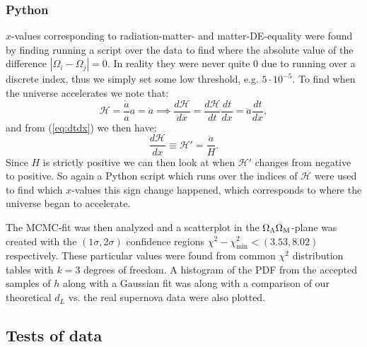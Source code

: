 \documentclass[%
reprint,
 amsmath,amssymb,
 aps,
]{revtex4-2}
\newcommand{\Hp}{\mathcal{H}}
\begin{document}
\subsubsection{Python}
$x$-values corresponding to radiation-matter- and matter-DE-equality were found by finding running a script over the data to find where the absolute value of the difference $|\Omega_i-\Omega_j|=0$. In reality they were never quite 0 due to running over a discrete index, thus we simply set some low threshold, e.g. $5\cdot10^{-5}$. To find when the universe accelerates we note that:
\[\Hp=\frac{\dot a}{a}a=\dot a\implies \frac{d\Hp}{dx}=\frac{d\Hp}{dt}\frac{dt}{dx}=\ddot{a}\frac{dt}{dx},\]
and from (\ref{eq:dtdx}) we then have:
\[\frac{d\Hp}{dx}\equiv\Hp'=\frac{\ddot a}{H}.\]
Since $H$ is strictly positive we can then look at when $\Hp'$ changes from negative to positive. So again a Python script which runs over the indices of $\Hp$ were used to find which $x$-values this sign change happened, which corresponds to where the universe began to accelerate. 

The MCMC-fit was then analyzed and a scatterplot in the $\Omega_\Lambda\Omega_\text M$-plane was created with the $(1\sigma,2\sigma)$ confidence regions $\chi^2-\chi^2_\text{min}<(3.53,8.02)$ respectively. These particular values were found from common $\chi^2$ distribution tables with $k=3$ degrees of freedom. A histogram of the PDF  from the accepted samples of $h$ along with a Gaussian fit was along with a comparison of our theoretical $d_L$ vs. the real supernova data were also plotted.

\subsection{Tests of data}
\end{document}
